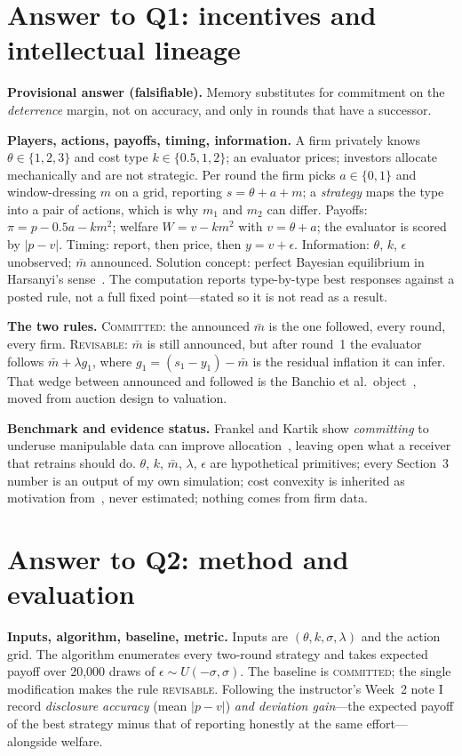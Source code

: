 \section{Answer to Q1: incentives and intellectual lineage}
\textbf{Provisional answer (falsifiable).} Memory substitutes for commitment on
the \emph{deterrence} margin, not on accuracy, and only in rounds that have a
successor.

\textbf{Players, actions, payoffs, timing, information.} A firm privately knows
$\theta\in\{1,2,3\}$ and cost type $k\in\{0.5,1,2\}$; an evaluator prices;
investors allocate mechanically and are not strategic. Per round the firm picks
$a\in\{0,1\}$ and window-dressing $m$ on a grid, reporting $s=\theta+a+m$; a
\emph{strategy} maps the type into a pair of actions, which is why $m_1$ and
$m_2$ can differ. Payoffs: $\pi=p-0.5a-km^{2}$; welfare $W=v-km^{2}$ with
$v=\theta+a$; the evaluator is scored by $|p-v|$. Timing: report, then price,
then $y=v+\epsilon$. Information: $\theta$, $k$, $\epsilon$ unobserved; $\bar m$
announced. Solution concept: perfect Bayesian equilibrium in Harsanyi's
sense~\cite{harsanyi1968}. The computation reports type-by-type best responses
against a posted rule, not a full fixed point---stated so it is not read as a
result.

\textbf{The two rules.} \textsc{Committed}: the announced $\bar m$ is the one
followed, every round, every firm. \textsc{Revisable}: $\bar m$ is still
announced, but after round~1 the evaluator follows $\bar m+\lambda g_1$, where
$g_1=(s_1-y_1)-\bar m$ is the residual inflation it can infer. That wedge
between announced and followed is the Banchio et al.\ object~\cite{banchio2025},
moved from auction design to valuation.

\textbf{Benchmark and evidence status.} Frankel and Kartik show \emph{committing}
to underuse manipulable data can improve allocation~\cite{frankel2022}, leaving
open what a receiver that retrains should do. $\theta$, $k$, $\bar m$, $\lambda$,
$\epsilon$ are hypothetical primitives; every Section~3 number is an output of my
own simulation; cost convexity is inherited as motivation
from~\cite{fischbacher2013}, never estimated; nothing comes from firm data.

\section{Answer to Q2: method and evaluation}
\textbf{Inputs, algorithm, baseline, metric.} Inputs are
$(\theta,k,\sigma,\lambda)$ and the action grid. The algorithm enumerates every
two-round strategy and takes expected payoff over 20{,}000 draws of
$\epsilon\sim U(-\sigma,\sigma)$. The baseline is \textsc{committed}; the single
modification makes the rule \textsc{revisable}. Following the instructor's
Week~2 note I record \emph{disclosure accuracy} (mean $|p-v|$) \emph{and
deviation gain}---the expected payoff of the best strategy minus that of
reporting honestly at the same effort---alongside welfare.

